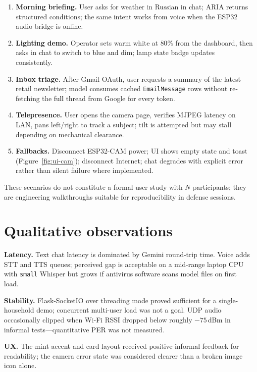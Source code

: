 \documentclass[12pt,a4paper]{report}
\begin{document}
\begin{enumerate}
    \item \textbf{Morning briefing.} User asks for weather in Russian in chat; ARIA returns structured conditions; the same intent works from voice when the ESP32 audio bridge is online.
    \item \textbf{Lighting demo.} Operator sets warm white at 80\% from the dashboard, then asks in chat to switch to blue and dim; lamp state badge updates consistently.
    \item \textbf{Inbox triage.} After Gmail OAuth, user requests a summary of the latest retail newsletter; model consumes cached \texttt{EmailMessage} rows without re-fetching the full thread from Google for every token.
    \item \textbf{Telepresence.} User opens the camera page, verifies MJPEG latency on LAN, pans left/right to track a subject; tilt is attempted but may stall depending on mechanical clearance.
    \item \textbf{Fallbacks.} Disconnect ESP32-CAM power; UI shows empty state and toast (Figure~\ref{fig:ui-cam}); disconnect Internet; chat degrades with explicit error rather than silent failure where implemented.
\end{enumerate}

These scenarios do not constitute a formal user study with $N$ participants; they are engineering walkthroughs suitable for reproducibility in defense sessions.

\section{Qualitative observations}

\textbf{Latency.} Text chat latency is dominated by Gemini round-trip time. Voice adds STT and TTS queues; perceived gap is acceptable on a mid-range laptop CPU with \texttt{small} Whisper but grows if antivirus software scans model files on first load.

\textbf{Stability.} Flask-SocketIO over threading mode proved sufficient for a single-household demo; concurrent multi-user load was not a goal. UDP audio occasionally clipped when Wi-Fi RSSI dropped below roughly $-75$\,dBm in informal tests---quantitative PER was not measured.

\textbf{UX.} The mint accent and card layout received positive informal feedback for readability; the camera error state was considered clearer than a broken image icon alone.
\end{document}
